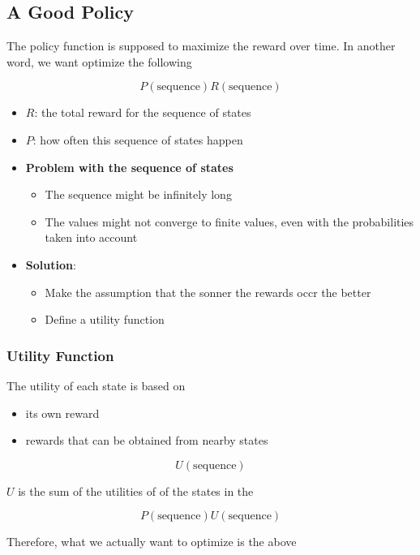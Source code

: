   \subsection{A Good Policy}

    The policy function is supposed to maximize the reward
    over time. In another word, we want optimize the following

    \begin{equation}
      P\left( \text{sequence} \right) R\left( \text{sequence} \right)
    \end{equation}

    \begin{itemize}
      \item $ R $: the total reward for the sequence of states
      \item $ P $: how often this sequence of states happen
      \item \textbf{Problem with the sequence of states}
      \begin{itemize}
        \item The sequence might be infinitely long
        \item The values might not converge to finite values, even with the
        probabilities taken into account
      \end{itemize}

      \item \textbf{Solution}:
      \begin{itemize}
        \item Make the assumption that the sonner the rewards occr the
        better
        \item Define a utility function
      \end{itemize}
    \end{itemize}

    \subsubsection{Utility Function}

      The utility of each state is based on

      \begin{itemize}
        \item its own reward
        \item rewards that can be obtained from nearby states
      \end{itemize}

      \begin{equation}
        U\left( \text{sequence} \right)
      \end{equation}

      $ U $ is the sum of the utilities of of the states in the

      \begin{equation}
        P\left( \text{sequence} \right) U\left( \text{sequence} \right)
      \end{equation}

      Therefore, what we actually want to optimize is the above
